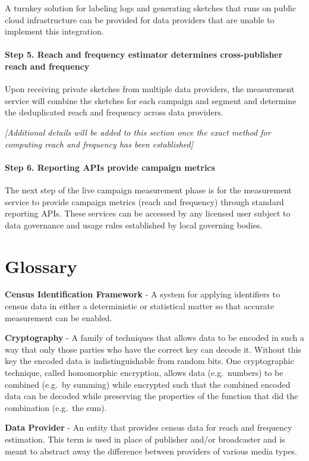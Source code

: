 \documentclass[]{article}
\let\oldparagraph\paragraph
\renewcommand{\paragraph}[1]{\oldparagraph{#1}\mbox{}}
\begin{document}
A turnkey solution for labeling logs and generating sketches that runs on public cloud infrastructure can be provided for data providers that are unable to implement this integration.

\paragraph{Step 5. Reach and frequency estimator determines cross-publisher reach and frequency}

Upon receiving private sketches from multiple data providers, the measurement service will combine the sketches for each campaign and segment and determine the deduplicated reach and frequency across data
providers.

\emph{{[}Additional details will be added to this section once the exact method for computing reach and frequency has been established{]}}


\paragraph{Step 6. Reporting APIs provide campaign metrics}

The next step of the live campaign measurement phase is for the measurement service to provide campaign metrics (reach and frequency) through standard reporting APIs. These services can be accessed by any licensed user subject to data governance and usage rules established by local governing bodies.


\section{Glossary}

\textbf{Census Identification Framework} - A system for applying identifiers to census data in either a deterministic or statistical matter so that accurate measurement can be enabled.

\textbf{Cryptography} - A family of techniques that allows data to be encoded in such a way that only those parties who have the correct key can decode it. Without this key the encoded data is indistinguishable
from random bits. One cryptographic technique, called homomorphic encryption, allows data (e.g.~numbers) to be combined (e.g.~by summing) while encrypted such that the combined encoded data can be decoded while preserving the properties of the function that did the combination (e.g.~the sum).

\textbf{Data Provider} - An entity that provides census data for reach and frequency estimation. This term is used in place of publisher and/or broadcaster and is meant to abstract away the difference between providers of various media types.
\end{document}

